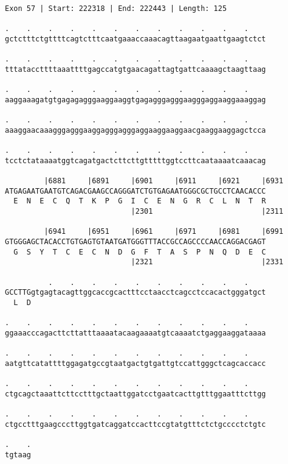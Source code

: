 \documentclass{article}
\begin{document}
\begin{Verbatim}
Exon 57 | Start: 222318 | End: 222443 | Length: 125
 
.    .    .    .    .    .    .    .    .    .    .    .    
gctctttctgttttcagtctttcaatgaaaccaaacagttaagaatgaattgaagtctct
  
.    .    .    .    .    .    .    .    .    .    .    .    
tttataccttttaaattttgagccatgtgaacagattagtgattcaaaagctaagttaag
  
.    .    .    .    .    .    .    .    .    .    .    .    
aaggaaagatgtgagagagggaaggaaggtgagagggagggaagggaggaaggaaaggag
  
.    .    .    .    .    .    .    .    .    .    .    .    
aaaggaacaaagggagggaaggagggagggaggaaggaaggaacgaaggaaggagctcca
  
.    .    .    .    .    .    .    .    .    .    .    .    
tcctctataaaatggtcagatgactcttcttgtttttggtccttcaataaaatcaaacag
  
         |6881     |6891     |6901     |6911     |6921     |6931
ATGAGAATGAATGTCAGACGAAGCCAGGGATCTGTGAGAATGGGCGCTGCCTCAACACCC
  E  N  E  C  Q  T  K  P  G  I  C  E  N  G  R  C  L  N  T  R
                             |2301                         |2311
  
         |6941     |6951     |6961     |6971     |6981     |6991
GTGGGAGCTACACCTGTGAGTGTAATGATGGGTTTACCGCCAGCCCCAACCAGGACGAGT
  G  S  Y  T  C  E  C  N  D  G  F  T  A  S  P  N  Q  D  E  C
                             |2321                         |2331
  
          .    .    .    .    .    .    .    .    .    .    
GCCTTGgtgagtacagttggcaccgcactttcctaacctcagcctccacactgggatgct
  L  D                                                      
  
.    .    .    .    .    .    .    .    .    .    .    .    
ggaaacccagacttcttatttaaaatacaagaaaatgtcaaaatctgaggaaggataaaa
  
.    .    .    .    .    .    .    .    .    .    .    .    
aatgttcatattttggagatgccgtaatgactgtgattgtccattgggctcagcaccacc
  
.    .    .    .    .    .    .    .    .    .    .    .    
ctgcagctaaattcttcctttgctaattggatcctgaatcacttgtttggaatttcttgg
  
.    .    .    .    .    .    .    .    .    .    .    .    
ctgcctttgaagcccttggtgatcaggatccacttccgtatgtttctctgcccctctgtc
  
.    .
tgtaag
\end{Verbatim}
\newpage
\end{document}
